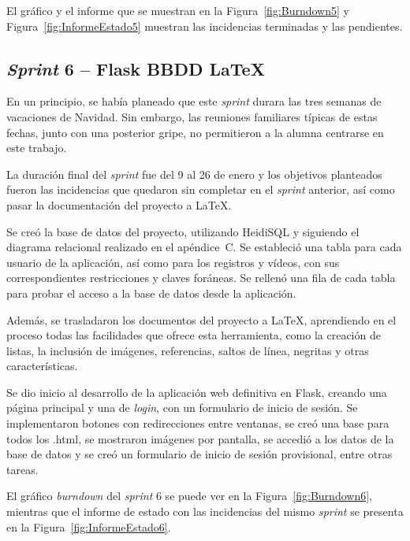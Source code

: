 El gráfico y el informe que se muestran en la Figura~\ref{fig:Burndown5} y Figura~\ref{fig:InformeEstado5} muestran las incidencias terminadas y las pendientes.


\subsection{\textit{Sprint} 6 – Flask BBDD \LaTeX}
En un principio, se había planeado que este \textit{sprint} durara las tres semanas de vacaciones de Navidad. Sin embargo, las reuniones familiares típicas de estas fechas, junto con una posterior gripe, no permitieron a la alumna centrarse en este trabajo.

La duración final del \textit{sprint} fue del 9 al 26 de enero y los objetivos planteados fueron las incidencias que quedaron sin completar en el \textit{sprint} anterior, así como pasar la documentación del proyecto a \LaTeX{}.

Se creó la base de datos del proyecto, utilizando HeidiSQL y siguiendo el diagrama relacional realizado en el apéndice~C. Se estableció una tabla para cada usuario de la aplicación, así como para los registros y vídeos, con sus correspondientes restricciones y claves foráneas. Se rellenó una fila de cada tabla para probar el acceso a la base de datos desde la aplicación.

Además, se trasladaron los documentos del proyecto a \LaTeX{}, aprendiendo en el proceso todas las facilidades que ofrece esta herramienta, como la creación de listas, la inclusión de imágenes, referencias, saltos de línea, negritas y otras características.

Se dio inicio al desarrollo de la aplicación web definitiva en Flask, creando una página principal y una de \textit{login}, con un formulario de inicio de sesión. Se implementaron botones con redirecciones entre ventanas, se creó una base para todos los .html, se mostraron imágenes por pantalla, se accedió a los datos de la base de datos y se creó un formulario de inicio de sesión provisional, entre otras tareas.

El gráfico \textit{burndown} del \textit{sprint} 6 se puede ver en la Figura~\ref{fig:Burndown6}, mientras que el informe de estado con las incidencias del mismo \textit{sprint} se presenta en la Figura~\ref{fig:InformeEstado6}.




